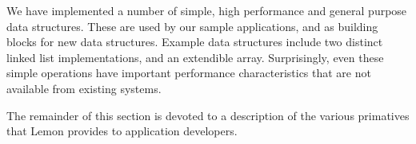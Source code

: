 \documentclass[letterpaper,twocolumn,english]{article}
\newcommand{\yad}{Lemon\xspace}
\begin{document}
We have implemented a number of simple, high performance
and general purpose data structures.  These are used by our sample
applications, and as building blocks for new data structures.  Example
data structures include two distinct linked list implementations, and
an extendible array.  Surprisingly, even these simple operations have
important performance characteristics that are not available from
existing systems.

The remainder of this section is devoted to a description of the
various primatives that \yad provides to application developers.



%
%
%
%
%
%
%
%
\end{document}
